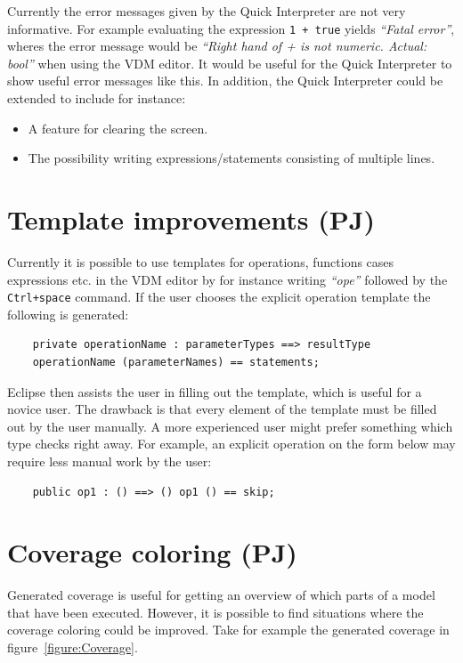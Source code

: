 \documentclass[11pt]{overturerep} \usepackage{t1enc,times,a4,t1enc}
\begin{document}
Currently the error messages given by the Quick Interpreter are not very
informative. For example evaluating the expression \texttt{1 + true} yields
\textit{``Fatal error''}, wheres the error message would be \textit{``Right
hand of + is not numeric. Actual: bool''} when using the VDM editor. It would
be useful for the Quick Interpreter to show useful error messages like this. In
addition, the Quick Interpreter could be extended to include for instance:

\begin{itemize}
    \item A feature for clearing the screen.
    \item The possibility writing expressions/statements consisting of multiple
        lines.
\end{itemize}


\section{Template improvements (PJ)}

Currently it is possible to use templates for operations, functions cases
expressions etc. in the VDM editor by for instance writing \textit{``ope''}
followed by the \texttt{Ctrl+space} command. If the user chooses the explicit
operation template the following is generated:

\begin{lstlisting} 
    private operationName : parameterTypes ==> resultType
    operationName (parameterNames) == statements; 
\end{lstlisting}

Eclipse then assists the user in filling out the template, which is useful for
a novice user. The drawback is that every element of the template must be
filled out by the user manually. A more experienced user might prefer something
which type checks right away. For example, an explicit operation on the form
below may require less manual work by the user:

\begin{lstlisting} 
    public op1 : () ==> () op1 () == skip; 
\end{lstlisting}


\section{Coverage coloring (PJ)}

Generated coverage is useful for getting an overview of which parts of a model
that have been executed. However, it is possible to find situations where the
coverage coloring could be improved. Take for example the generated coverage in
figure~\ref{figure:Coverage}.
\end{document}
